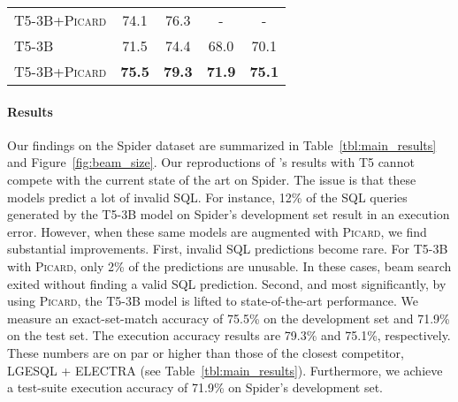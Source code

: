 \documentclass[11pt]{article}
\newcommand{\Picard}{\textsc{Picard}}
\newcommand{\texttosql}{text-to-SQL}
\begin{document}
\begin{table*}[ht]
\begin{tabular}{lcccc}
T5-3B+\Picard{}                                                       & 74.1           & 76.3           & -              & -              \\
T5-3B                                                       & 71.5           & 74.4           & 68.0           & 70.1           \\
T5-3B+\Picard{}                                             & \textbf{75.5}  & \textbf{79.3}  & \textbf{71.9}  & \textbf{75.1}  \\
\bottomrule
\end{tabular}
\caption{Our results (bottom) and relevant prior art (top) on the Spider \texttosql{} task. Shown are the exact-set-match accuracy (EM) and execution accuracy (EX) percentages on Spider's development and test sets. Our results are for a beam of size 4, and \Picard{} is parsing with guards for the top-2 token predictions. A dagger (\textdagger{}) indicates use of database content, otherwise schema only.}
\label{tbl:main_results}
\end{table*}

\paragraph{Results}

Our findings on the Spider dataset are summarized in Table~\ref{tbl:main_results}
and Figure~\ref{fig:beam_size}.
Our reproductions of \citet{shaw2020compositional}'s results
with T5 cannot compete with the current state of the art on Spider.
The issue is that these models predict a lot of invalid SQL.
For instance, 12\% of the SQL queries generated by the T5-3B model
on Spider's development set result in an execution error.
However, when these same models are augmented with \Picard{},
we find substantial improvements.
First, invalid SQL predictions become rare.
For T5-3B with \Picard{},
only 2\% of the predictions are unusable.
In these cases,
beam search exited without finding a valid SQL prediction.
Second, and most significantly,
by using \Picard{}, the T5-3B model is lifted to state-of-the-art performance.
We measure an exact-set-match accuracy of
75.5\% on the development set and 71.9\% on the test set.
The execution accuracy results are 79.3\% and 75.1\%, respectively.
These numbers are on par or higher than those of the closest competitor,
LGESQL + \textsc{ELECTRA} \citep{cao-etal-2021-lgesql} (see Table~\ref{tbl:main_results}).
Furthermore, we achieve a test-suite execution accuracy of 71.9\% on Spider's development set.
\end{document}
